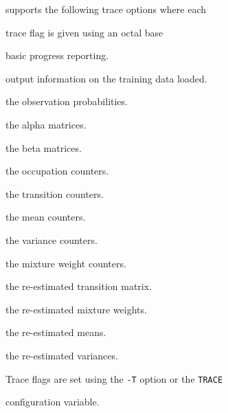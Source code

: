 









 supports the following trace options where each


trace flag is given using an octal base


\begin{optlist}


    basic progress reporting.


    output information on the training data loaded.


    the observation probabilities.


    the alpha matrices.


    the beta matrices.


    the occupation counters.


    the transition counters.


    the mean counters.


    the variance counters.


    the mixture weight counters.


    the re-estimated transition matrix.


    the re-estimated mixture weights.


    the re-estimated means.


    the re-estimated variances.


\end{optlist}


Trace flags are set using the \texttt{-T} option or the  \texttt{TRACE} 


configuration variable.


















